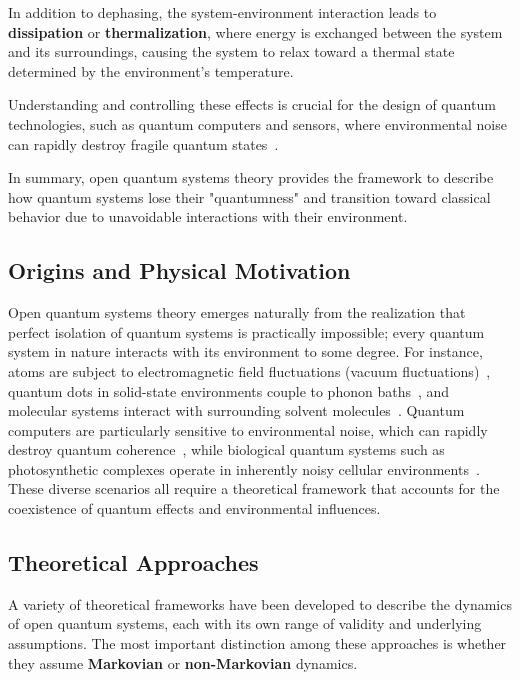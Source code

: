In addition to dephasing, the system-environment interaction leads to \textbf{dissipation} or \textbf{thermalization}, where energy is exchanged between the system and its surroundings, causing the system to relax toward a thermal state determined by the environment's temperature.

Understanding and controlling these effects is crucial for the design of quantum technologies, such as quantum computers and sensors, where environmental noise can rapidly destroy fragile quantum states~\cite{Schlosshauer2007DecoherenceBook, LaddEtAl2010QuantumComputers}.

In summary, open quantum systems theory provides the framework to describe how quantum systems lose their "quantumness" and transition toward classical behavior due to unavoidable interactions with their environment.

\subsection{Origins and Physical Motivation}

Open quantum systems theory emerges naturally from the realization that perfect isolation of quantum systems is practically impossible; every quantum system in nature interacts with its environment to some degree. For instance, atoms are subject to electromagnetic field fluctuations (vacuum fluctuations)~\cite{BreuerPetruccione2009TheoryOpenQuantum}, quantum dots in solid-state environments couple to phonon baths~\cite{Weiss2012QuantumDissipativeSystems}, and molecular systems interact with surrounding solvent molecules~\cite{Mukamel1995PrinciplesNonlinearOptical}. Quantum computers are particularly sensitive to environmental noise, which can rapidly destroy quantum coherence~\cite{LaddEtAl2010QuantumComputers}, while biological quantum systems such as photosynthetic complexes operate in inherently noisy cellular environments~\cite{Schlosshauer2007DecoherenceBook}. These diverse scenarios all require a theoretical framework that accounts for the coexistence of quantum effects and environmental influences.


\subsection{Theoretical Approaches}

A variety of theoretical frameworks have been developed to describe the dynamics of open quantum systems, each with its own range of validity and underlying assumptions. The most important distinction among these approaches is whether they assume \textbf{Markovian} or \textbf{non-Markovian} dynamics.

